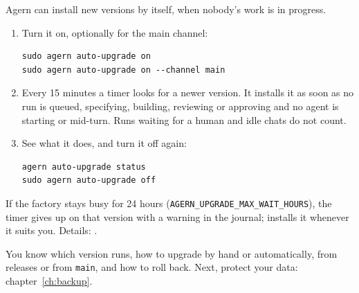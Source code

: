 Agern can install new versions by itself, when nobody's work is in progress.

\begin{enumerate}
  \item Turn it on, optionally for the main channel:
\begin{lstlisting}
sudo agern auto-upgrade on
sudo agern auto-upgrade on --channel main
\end{lstlisting}
  \item Every 15 minutes a timer looks for a newer version. It installs it as soon as no run is
    queued, specifying, building, reviewing or approving and no agent is starting or mid-turn. Runs
    waiting for a human and idle chats do not count.
  \item See what it does, and turn it off again:
\begin{lstlisting}
agern auto-upgrade status
sudo agern auto-upgrade off
\end{lstlisting}
\end{enumerate}

If the factory stays busy for 24 hours (\texttt{AGERN\_UPGRADE\_MAX\_WAIT\_HOURS}), the timer gives up
on that version with a warning in the journal;  installs it whenever it
suits you. Details:
.

\whatyouhave
You know which version runs, how to upgrade by hand or automatically, from releases or from
\texttt{main}, and how to roll back. Next, protect your data: chapter~\ref{ch:backup}.
